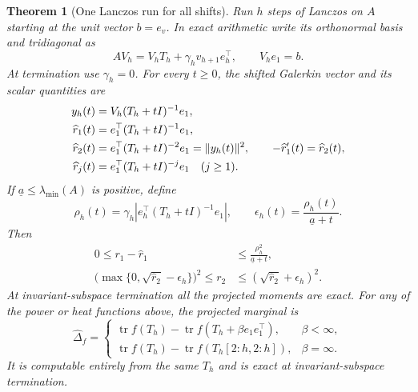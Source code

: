 \documentclass[11pt]{article}
\newtheorem{theorem}{Theorem}
\DeclareMathOperator{\tr}{tr}
\begin{document}
\begin{theorem}[One Lanczos run for all shifts]\label{thm:lanczos}
Run $h$ steps of Lanczos on $A$ starting at the unit vector $b=e_v$.
In exact arithmetic write its orthonormal basis and tridiagonal as
\[
 AV_h=V_hT_h+\gamma_h v_{h+1}e_h^\top,\qquad V_he_1=b.
\]
At termination use $\gamma_h=0$. For every $t\geq0$, the shifted
Galerkin vector and its scalar quantities are
\begin{align}
 y_h(t)&=V_h(T_h+tI)^{-1}e_1,\notag\\
 \widehat r_1(t)&=e_1^\top(T_h+tI)^{-1}e_1,\label{eq:projectedmoments}\\
 \widehat r_2(t)&=e_1^\top(T_h+tI)^{-2}e_1=\|y_h(t)\|^2,
 \qquad -\widehat r'_1(t)=\widehat r_2(t),\notag\\
 \widehat r_j(t)&=e_1^\top(T_h+tI)^{-j}e_1\quad(j\geq1).\notag
\end{align}
If $\underline a\leq\lambda_{\min}(A)$ is positive, define
\[
 \rho_h(t)=\gamma_h|e_h^\top(T_h+tI)^{-1}e_1|,\qquad
 \epsilon_h(t)=\frac{\rho_h(t)}{\underline a+t}.
\]
Then
\begin{align}
 0\leq r_1-\widehat r_1&\leq\frac{\rho_h^2}{\underline a+t},\label{eq:r1bound}\\
 \bigl(\max\{0,\sqrt{\widehat r_2}-\epsilon_h\}\bigr)^2
 \leq r_2&\leq(\sqrt{\widehat r_2}+\epsilon_h)^2.\label{eq:r2bound}
\end{align}
At invariant-subspace termination all the projected moments are exact.
For any of the power or heat functions above, the projected marginal is
\begin{equation}\label{eq:reducedmarginal}
 \widehat\Delta_f=
 \begin{cases}
 \tr f(T_h)-\tr f(T_h+\beta e_1e_1^\top),&\beta<\infty,\\
 \tr f(T_h)-\tr f(T_h[2:h,2:h]),&\beta=\infty.
 \end{cases}
\end{equation}
It is computable entirely from the same $T_h$ and is exact at
invariant-subspace termination.
\end{theorem}
\end{document}
